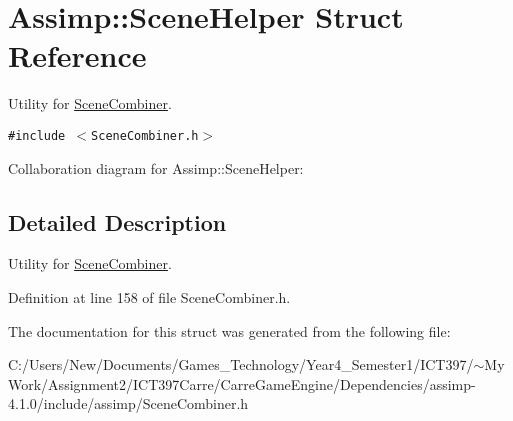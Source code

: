 \hypertarget{struct_assimp_1_1_scene_helper}{
\section{Assimp::SceneHelper Struct Reference}
\label{struct_assimp_1_1_scene_helper}
}
Utility for \hyperlink{class_assimp_1_1_scene_combiner}{SceneCombiner}.  


{\tt \#include $<$SceneCombiner.h$>$}

Collaboration diagram for Assimp::SceneHelper:

\subsection{Detailed Description}
Utility for \hyperlink{class_assimp_1_1_scene_combiner}{SceneCombiner}. 

Definition at line 158 of file SceneCombiner.h.

The documentation for this struct was generated from the following file:\begin{CompactItemize}
\item 
C:/Users/New/Documents/Games\_\-Technology/Year4\_\-Semester1/ICT397/$\sim$My Work/Assignment2/ICT397Carre/CarreGameEngine/Dependencies/assimp-4.1.0/include/assimp/SceneCombiner.h\end{CompactItemize}
